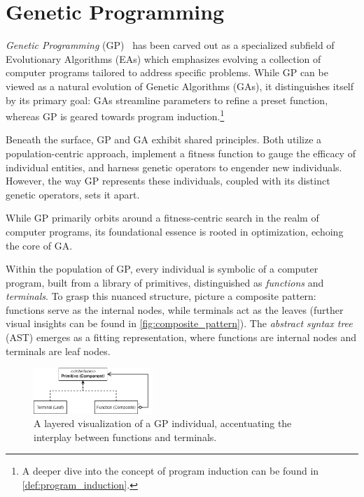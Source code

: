 \section{Genetic Programming}
\label{sec:bg:gp}

  \emph{Genetic Programming} (GP)~\autocite{kozaGeneticProgrammingProgramming1992a,kozaGeneticProgrammingII1994,poliFieldGuideGenetic2008a,yuIntroductionEvolutionaryAlgorithms2010}
  has been carved out as a specialized subfield of Evolutionary Algorithms (EAs) 
  which emphasizes evolving a collection of computer programs tailored to address 
  specific problems. While GP can be viewed as a natural evolution of Genetic 
  Algorithms (GAs), it distinguishes itself by its primary goal: GAs streamline 
  parameters to refine a preset function, whereas GP is geared towards program 
  induction.\footnote{%
    A deeper dive into the concept of program induction can be found in \vref{def:program_induction}.
  }

  Beneath the surface, GP and GA exhibit shared principles. Both utilize a population-centric approach, implement a fitness function to gauge the efficacy of individual entities, and harness genetic operators to engender new individuals. However, the way GP represents these individuals, coupled with its distinct genetic operators, sets it apart.

  \begin{remark}
  While GP primarily orbits around a fitness-centric search in the realm of computer programs, its foundational essence is rooted in optimization, echoing the core of GA.
  \end{remark}

  Within the population of GP, every individual is symbolic of a computer 
  program, built from a library of primitives, distinguished as \emph{functions} 
  and \emph{terminals}. To grasp this nuanced structure, picture a composite
  pattern: functions serve as the internal nodes, while terminals act as the leaves (further visual insights can be found in \vref{fig:composite_pattern}). The \emph{abstract syntax tree} (AST) emerges as a fitting representation, where functions are internal nodes and terminals are leaf nodes.

  \begin{figure}[ht!]
    \centering
    \includegraphics[width=0.4\textwidth]
      {img/theoretical_framework/GP Composite.png}
    \caption{
      A layered visualization of a GP individual, accentuating the interplay
      between functions and terminals.
    }
    \label{fig:composite_pattern}
  \end{figure}

